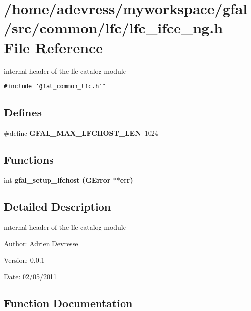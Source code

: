 \section{/home/adevress/myworkspace/gfal/src/common/lfc/lfc\_\-ifce\_\-ng.h File Reference}
\label{lfc__ifce__ng_8h}
internal header of the lfc catalog module 

{\tt \#include \char`\"{}gfal\_\-common\_\-lfc.h\char`\"{}}\par
\subsection*{Defines}
\begin{CompactItemize}
\item 
\#define \textbf{GFAL\_\-MAX\_\-LFCHOST\_\-LEN}~1024\label{lfc__ifce__ng_8h_4ba01f362057d237e7234f527da40cdb}

\end{CompactItemize}
\subsection*{Functions}
\begin{CompactItemize}
\item 
int \bf{gfal\_\-setup\_\-lfchost} (GError $\ast$$\ast$err)
\end{CompactItemize}


\subsection{Detailed Description}
internal header of the lfc catalog module 

\begin{Desc}
\item[Author:]Adrien Devresse \end{Desc}
\begin{Desc}
\item[Version:]0.0.1 \end{Desc}
\begin{Desc}
\item[Date:]02/05/2011 \end{Desc}


\subsection{Function Documentation}
